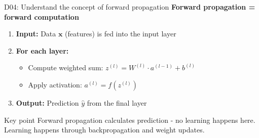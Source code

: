 \documentclass[aspectratio=169, 10pt]{beamer}
\begin{document}
\begin{frame}{D04: Understand the concept of forward propagation}
    \textbf{Forward propagation = forward computation}
    
    \begin{enumerate}
        \item \textbf{Input:} Data $\mathbf{x}$ (features) is fed into the input layer
        \item \textbf{For each layer:}
        \begin{itemize}
            \item Compute weighted sum: $z^{(l)} = W^{(l)} \cdot a^{(l-1)} + b^{(l)}$
            \item Apply activation: $a^{(l)} = f(z^{(l)})$
        \end{itemize}
        \item \textbf{Output:} Prediction $\hat{y}$ from the final layer
    \end{enumerate}
    
    \vspace{0.3cm}
    \begin{center}
    \end{center}
    
    \vspace{0.3cm}
    \begin{block}{Key point}
        Forward propagation calculates prediction - no learning happens here. Learning happens through backpropagation and weight updates.
    \end{block}
\end{frame}
\end{document}
